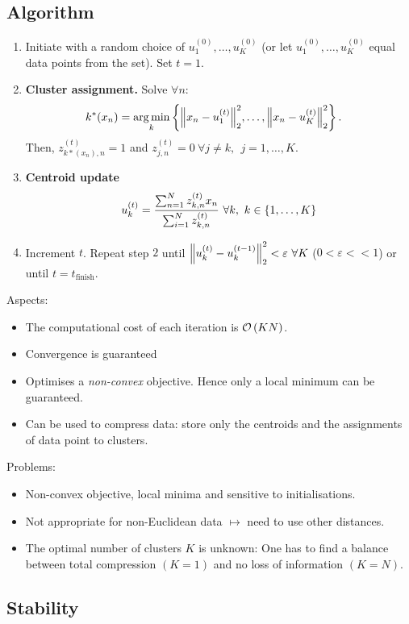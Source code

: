 \subsection{Algorithm}
\begin{enumerate}
\item Initiate with a random choice of $u_1^{(0)}, \ldots, u_K^{(0)}$ (or let $u_1^{(0)}, \ldots, u_K^{(0)}$ equal data points from the set). Set $t=1$.
\item \textbf{Cluster assignment.} Solve $\forall n$:
    \begin{align*}
        k^*(x_n) &=\argmin_k \left\{ \norm{x_n-u_1^{(t)}}_2^2,\ldots, \norm{x_n-u_K^{(t)}}_2^2 \right\}.
    \end{align*}
    Then, $z_{k*(x_n),n}^{(t)} = 1$ and $z_{j,n}^{(t)} =0\ \forall j\neq k,\ \ j=1,\ldots, K$.
\item \textbf{Centroid update} 
    \begin{align*}
        u_k^{(t)} = {\sum_{n=1}^N z_{k,n}^{(t)} x_n \over \sum_{i=1}^N z_{k,n}^{(t)}}\ \forall k,\ k\in\{1,\ldots,K\}
    \end{align*}
\item Increment $t$. Repeat step $2$ until $\left\lVert u_k^{(t)}-u_k^{(t-1)}\right\rVert_2^2 < \varepsilon\ \forall K$ ($0<\varepsilon << 1$) or until $t=t_\text{finish}$.  
\end{enumerate}
Aspects:
\begin{itemize}
    \item The computational cost of each iteration is $\mathcal O\left(KN\right)$.
    \item Convergence is guaranteed
    \item Optimises a \emph{non-convex} objective. Hence only a local minimum can be guaranteed.
    \item Can be used to compress data: store only the centroids and the assignments of data point to clusters.
\end{itemize}
Problems:
\begin{itemize}
\item Non-convex objective, local minima and sensitive to initialisations.
\item Not appropriate for non-Euclidean data $\mapsto$ need to use other distances.
\item The optimal number of clusters $K$ is unknown: One has to find a balance between total compression $(K=1)$ and no loss of information $(K=N)$.
\end{itemize}

\subsection{Stability}
